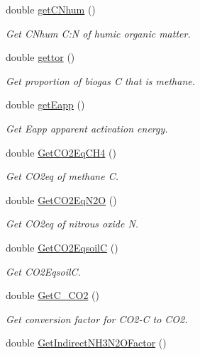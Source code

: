 \begin{DoxyCompactItemize}
double \mbox{\hyperlink{class_global_vars_ae3c99a4d8f250b66225cc04944f5cbf9}{get\+C\+Nhum}} ()
\begin{DoxyCompactList}\small\item\em Get C\+Nhum C\+:N of humic organic matter. \end{DoxyCompactList}\item 
double \mbox{\hyperlink{class_global_vars_a60e8f9c8b6c0c733505a44c6d90ee683}{gettor}} ()
\begin{DoxyCompactList}\small\item\em Get proportion of biogas C that is methane. \end{DoxyCompactList}\item 
double \mbox{\hyperlink{class_global_vars_af42c50c71b5cfd8c3569e9a0cfc78491}{get\+Eapp}} ()
\begin{DoxyCompactList}\small\item\em Get Eapp apparent activation energy. \end{DoxyCompactList}\item 
double \mbox{\hyperlink{class_global_vars_ac7ae0cf95fa3e649fac5769867ec1de0}{Get\+C\+O2\+Eq\+C\+H4}} ()
\begin{DoxyCompactList}\small\item\em Get C\+O2eq of methane C. \end{DoxyCompactList}\item 
double \mbox{\hyperlink{class_global_vars_a21329208db96df468bea834b2467fe00}{Get\+C\+O2\+Eq\+N2O}} ()
\begin{DoxyCompactList}\small\item\em Get C\+O2eq of nitrous oxide N. \end{DoxyCompactList}\item 
double \mbox{\hyperlink{class_global_vars_a1a2f3998d5e4cb4bf6f633b30b5433c0}{Get\+C\+O2\+EqsoilC}} ()
\begin{DoxyCompactList}\small\item\em Get C\+O2\+EqsoilC. \end{DoxyCompactList}\item 
double \mbox{\hyperlink{class_global_vars_a3395cb56ec72d5e9257d67860d7c29c8}{Get\+C\+\_\+\+C\+O2}} ()
\begin{DoxyCompactList}\small\item\em Get conversion factor for C\+O2-\/C to C\+O2. \end{DoxyCompactList}\item 
double \mbox{\hyperlink{class_global_vars_abd1cd815e0916bfe12a99d994b77a6d6}{Get\+Indirect\+N\+H3\+N2\+O\+Factor}} ()

\end{DoxyCompactItemize}
